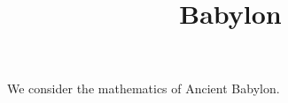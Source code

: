 \documentclass{ximera}
\title{Babylon}
\begin{document}
\begin{abstract}
\end{abstract}
\maketitle

We consider the mathematics of Ancient Babylon.
\end{document}
